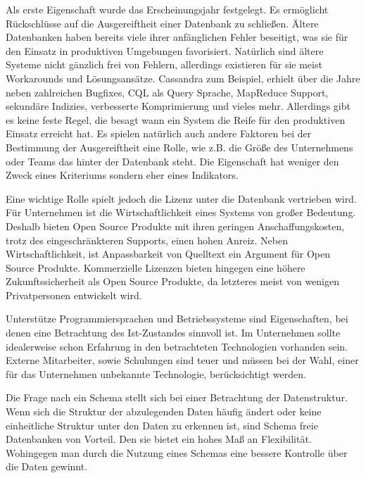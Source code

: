 Als erste Eigenschaft wurde das Erscheinungsjahr festgelegt. Es ermöglicht Rückschlüsse auf die Ausgereiftheit einer Datenbank zu schließen. Ältere Datenbanken haben bereits viele ihrer anfänglichen Fehler beseitigt, was sie für den Einsatz in produktiven Umgebungen favorisiert. Natürlich sind ältere Systeme nicht gänzlich frei von Fehlern, allerdings existieren für sie meist Workarounds und Lösungsansätze. Cassandra zum Beispiel, erhielt über die Jahre neben zahlreichen Bugfixes, CQL als Query Sprache, MapReduce Support, sekundäre Indizies, verbesserte Komprimierung und vieles mehr. Allerdings gibt es keine feste Regel, die besagt wann ein System die Reife für den produktiven Einsatz erreicht hat. Es spielen natürlich auch andere Faktoren bei der Bestimmung der Ausgereiftheit eine Rolle, wie z.B. die Größe des Unternehmens oder Teams das hinter der Datenbank steht. Die Eigenschaft hat weniger den Zweck eines Kriteriums sondern eher eines Indikators. 

Eine wichtige Rolle spielt jedoch die Lizenz unter die Datenbank vertrieben wird. Für Unternehmen ist die Wirtschaftlichkeit eines Systems von großer Bedeutung. Deshalb bieten Open Source Produkte mit ihren geringen Anschaffungskosten, trotz des eingeschränkteren Supports, einen hohen Anreiz. Neben Wirtschaftlichkeit, ist Anpassbarkeit von Quelltext ein Argument für Open Source Produkte. 
Kommerzielle Lizenzen bieten hingegen eine höhere Zukunftssicherheit als Open Source Produkte, da letzteres meist von wenigen Privatpersonen entwickelt wird.

Unterstütze Programmiersprachen und Betriebssysteme sind Eigenschaften, bei denen eine Betrachtung des Ist-Zustandes sinnvoll ist. Im Unternehmen sollte idealerweise schon Erfahrung in den betrachteten Technologien vorhanden sein. Externe Mitarbeiter, sowie Schulungen sind teuer und müssen bei der Wahl, einer für das Unternehmen unbekannte Technologie, berücksichtigt werden. 

Die Frage nach ein Schema stellt sich bei einer Betrachtung der Datenstruktur. Wenn sich die Struktur der abzulegenden Daten häufig ändert oder keine einheitliche Struktur unter den Daten zu erkennen ist, sind Schema freie Datenbanken von Vorteil. Den sie bietet ein hohes Maß an Flexibilität. Wohingegen man durch die Nutzung eines Schemas eine bessere Kontrolle über die Daten gewinnt.  


